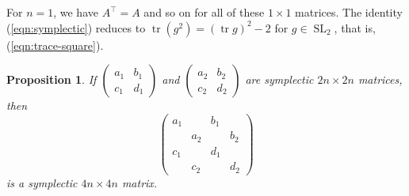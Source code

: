 \documentclass[11pt]{amsart}
\newtheorem{proposition}[theorem]{Proposition}
\theoremstyle{definition}
\numberwithin{figure}{section}
\numberwithin{equation}{section}
\numberwithin{table}{section}
\newcommand{\SL}{\operatorname{SL}}
\newcommand{\tr}{\operatorname{tr}}
\begin{document}
For $n=1$, we have $A^\top=A$ and so on for all of these $1 \times 1$ matrices.
The identity (\ref{eqn:symplectic}) reduces to
$
\tr(g^2) = (\tr{g})^2-2
$
for $g \in \SL_2$, that is, (\ref{eqn:trace-square}).

\begin{proposition} \label{prop:symplectic-double}
If $\begin{pmatrix} a_1 & b_1 \\ c_1 & d_1 \end{pmatrix}$ and $\begin{pmatrix} a_2 & b_2 \\ c_2 & d_2 \end{pmatrix}$ are symplectic $2n \times 2n$ matrices, then
\[
\begin{pmatrix} a_1 & & b_1 & \\
& a_2 & & b_2 \\
c_1 & & d_1 \\
& c_2 & & d_2
\end{pmatrix}
\]
is a symplectic $4n \times 4n$ matrix.
\end{proposition}
\end{document}
